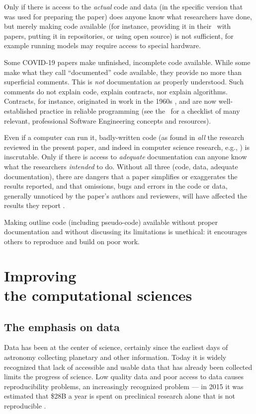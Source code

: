 \documentclass{comjnl}
\begin{document}
Only if there is access to the \emph{actual\/} code and data (in the specific version that was used for preparing the paper) does anyone know what researchers have done, but merely making code available (for instance, providing it in their \supplement\ with papers, putting it in repositories, or using open source) is not sufficient, for example running models may require access to special hardware.

Some COVID-19 papers  make unfinished, incomplete code available. While some  make what they call ``documented'' code available, they provide no more than superficial comments. This is \emph{not\/} documentation as properly understood. Such comments do not explain code, explain contracts, nor explain algorithms. Contracts, for instance, originated in work in the 1960s \cite{hoare}, and are now well-established practice in reliable programming {(see the \supplement\ for a checklist of many relevant, professional Software Engineering concepts and resources)}.

Even if a computer can run it, badly-written code (as found in \emph{all\/} the research reviewed in the present paper, and indeed in computer science research, e.g., \cite{machine-learning-reproducibility}) is inscrutable. Only if there is access to \emph{adequate\/} documentation can anyone know what the researchers \emph{intended\/} to do. Without all three (code, data, adequate documentation), there are dangers that a paper simplifies or exaggerates the results reported, and that omissions, bugs and errors in the code or data, generally unnoticed by the paper's authors and reviewers, will have affected the results they report \cite{relit}. 

Making outline code (including pseudo-code) available without proper documentation and without discussing its limitations is unethical: it encourages others to reproduce and build on poor work. 

\section{Improving \\ the computational sciences}
\label{section-discussion}
\subsection{The emphasis on data}
Data has been at the center of science, certainly since the earliest days of astronomy collecting planetary and other information. Today it is widely recognized that lack of accessible and usable data that has already been collected limits the progress of science. Low quality data and poor access to data causes reproducibility problems, an increasingly recognized problem --- in 2015 it was estimated that \$28B a year is spent on preclinical research alone that is not reproducible \cite{preclinical-reproducibility}.
\end{document}
